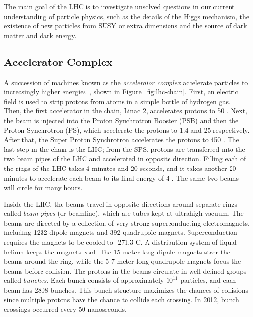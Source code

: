 The main goal of the LHC is to investigate unsolved questions in our current understanding of particle physics, such as the details of the Higgs mechanism, the existence of new particles from SUSY or extra dimensions and the source of dark matter and dark energy.
\subsection{Accelerator Complex}
A succession of machines known as the \emph{accelerator complex} accelerate particles to increasingly higher energies~\cite{cern-jinst-lhc}, shown in Figure~\ref{fig:lhc-chain}. First, an electric field is used to strip protons from atoms in a simple bottle of hydrogen gas. Then, the first accelerator in the chain, Linac 2, accelerates protons to 50 \mev. Next, the beam is injected into the Proton Synchrotron Booster (PSB) and then the Proton Synchrotron (PS), which accelerate the protons to 1.4 \gev and 25 \gev respectively. After that, the Super Proton Synchrotron accelerates the protons to 450 \gev. The last step in the chain is the LHC; from the SPS, protons are transferred into the two beam pipes of the LHC and accelerated in opposite direction. Filling each of the rings of the LHC takes 4 minutes and 20 seconds, and it takes another 20 minutes to accelerate each beam to its final energy of 4 \tev. The same two beams will circle for many hours.

Inside the LHC, the beams travel in opposite directions around separate rings called \emph{beam pipes} (or beamline), which are tubes kept at ultrahigh vacuum. The beams are directed by a collection of very strong superconducting electromagnets, including 1232 dipole magnets and 392 quadrupole magnets. Superconduction requires the magnets to be cooled to -271.3 C. A distribution system of liquid helium keeps the magnets cool. The 15 meter long dipole magnets steer the beams around the ring, while the 5-7 meter long quadrupole magnets focus the beams before collision. The protons in the beams circulate in well-defined groups called \textit{bunches}. Each bunch consists of approximately $10^{11}$ particles, and each beam has 2808 bunches. This bunch structure maximizes the chances of collisions since multiple protons have the chance to collide each crossing. In 2012, bunch crossings occurred every 50 nanoseconds.




